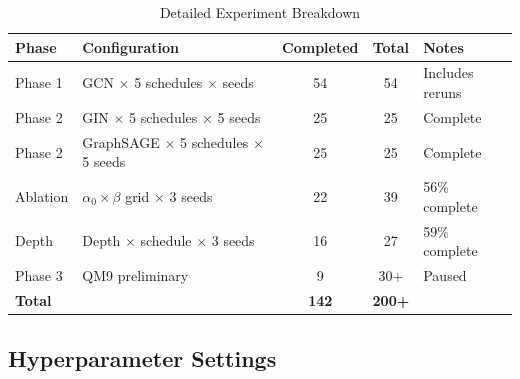 \documentclass[11pt,a4paper]{article}
\begin{document}
\begin{table}[H]
\centering
\caption{Detailed Experiment Breakdown}
\begin{tabular}{llccl}
\toprule
\textbf{Phase} & \textbf{Configuration} & \textbf{Completed} & \textbf{Total} & \textbf{Notes} \\
\midrule
Phase 1 & GCN $\times$ 5 schedules $\times$ seeds & 54 & 54 & Includes reruns \\
Phase 2 & GIN $\times$ 5 schedules $\times$ 5 seeds & 25 & 25 & Complete \\
Phase 2 & GraphSAGE $\times$ 5 schedules $\times$ 5 seeds & 25 & 25 & Complete \\
Ablation & $\alpha_0 \times \beta$ grid $\times$ 3 seeds & 22 & 39 & 56\% complete \\
Depth & Depth $\times$ schedule $\times$ 3 seeds & 16 & 27 & 59\% complete \\
Phase 3 & QM9 preliminary & 9 & 30+ & Paused \\
\midrule
\textbf{Total} & & \textbf{142} & \textbf{200+} & \\
\bottomrule
\end{tabular}
\end{table}

\subsection{Hyperparameter Settings}
\end{document}
